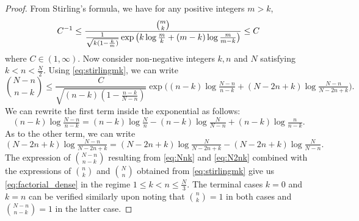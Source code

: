 \documentclass[10pt,a4paper]{amsart}
\begin{document}
\begin{proof}
From Stirling's formula, we have for any positive integers $m > k$,
\begin{equation}\label{eq:stirlingmk}
C^{-1} \le \frac{\binom{m}{k}}{\frac{1}{%
\sqrt{k(1 - \frac km)}} \exp\big(k \log \tfrac mk + (m - k) \log \tfrac m{m - k}\big)}  \le C
\end{equation}
where $C \in (1, \infty)$. %
Now consider non-negative integers $k, n$ and $N$ satisfying $k < n < \frac N2$. 
Using \eqref{eq:stirlingmk}, we can write
\begin{equation}\label{eq:Nnk}
\binom{N - n}{n-k} \le \frac{C}{\sqrt{(n - k)(1 - \frac{n - k}{N - n})}}  \exp\big((n-k) \log \tfrac {N-n}{n-k} + (N - 2n + k) \log \tfrac{N - n}{N - 2n + k}\big).
\end{equation}
We can rewrite the first term inside the exponential as follows:
\begin{equation}\label{eq:N2nk}
(n-k) \log \tfrac{N-n}{n-k} = (n - k) \log \tfrac N n - (n - k) \log \tfrac N{N-n} + (n - k) \log \tfrac n{n - k}.
\end{equation}
As to the other term, we can write
\begin{equation}\label{eq:decomp}
(N - 2n + k)\log \tfrac {N - n}{N - 2n + k} = (N - 2n + k) \log \tfrac{N}{N - 2n + 
k} - (N - 2n + k)\log \tfrac{N}{N - n}.
\end{equation}
The expression of $\binom{N - n}{n-k}$ resulting from \eqref{eq:Nnk} and 
\eqref{eq:N2nk} combined with the expressions of $\binom{n}{k}$ and $\binom{N}{n}$ 
obtained from \eqref{eq:stirlingmk} give us \eqref{eq:factorial_dense} in the 
regime $1 \le k < n \le \tfrac N3$. The terminal cases $k = 0$ and $k = n$ can be 
verified similarly upon noting that $\binom{n}{k} = 1$ in both cases and $\binom{N 
- n}{n - k} = 1$ in the latter case.


\end{proof}
\end{document}
